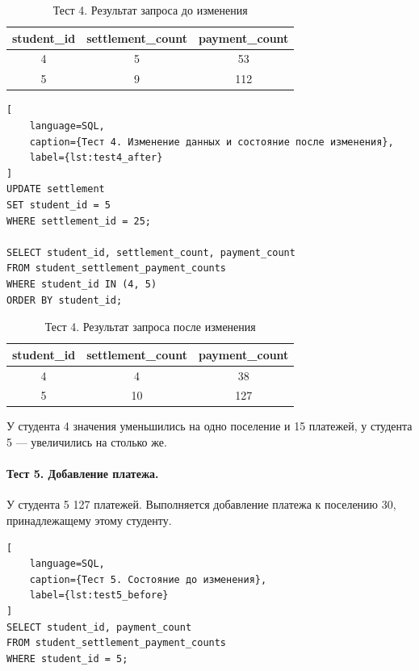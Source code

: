 \begin{table}[H]
\centering
\caption{Тест 4. Результат запроса до изменения}
\label{tab:test4_before}
\small
\begin{tabular}{|c|c|c|}
\hline
\textbf{student\_id} & \textbf{settlement\_count} & \textbf{payment\_count} \\ \hline
4 & 5 & 53 \\ \hline
5 & 9 & 112 \\ \hline
\end{tabular}
\end{table}

\begin{lstlisting}[
    language=SQL,
    caption={Тест 4. Изменение данных и состояние после изменения},
    label={lst:test4_after}
]
UPDATE settlement
SET student_id = 5
WHERE settlement_id = 25;

SELECT student_id, settlement_count, payment_count
FROM student_settlement_payment_counts
WHERE student_id IN (4, 5)
ORDER BY student_id;
\end{lstlisting}

\begin{table}[H]
\centering
\caption{Тест 4. Результат запроса после изменения}
\label{tab:test4_after}
\small
\begin{tabular}{|c|c|c|}
\hline
\textbf{student\_id} & \textbf{settlement\_count} & \textbf{payment\_count} \\ \hline
4 & 4 & 38 \\ \hline
5 & 10 & 127 \\ \hline
\end{tabular}
\end{table}

У студента 4 значения уменьшились на одно поселение и 15 платежей, у студента 5 --- увеличились на столько же.

\paragraph{Тест 5. Добавление платежа.}
У студента 5 127 платежей. Выполняется добавление платежа к поселению 30, принадлежащему этому студенту.

\begin{lstlisting}[
    language=SQL,
    caption={Тест 5. Состояние до изменения},
    label={lst:test5_before}
]
SELECT student_id, payment_count
FROM student_settlement_payment_counts
WHERE student_id = 5;
\end{lstlisting}

